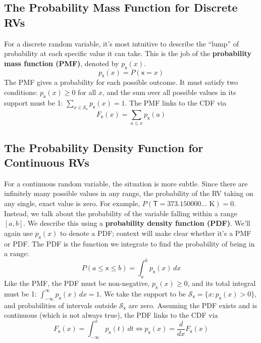 \subsection{The Probability Mass Function for Discrete RVs}
For a discrete random variable, it's most intuitive to describe the ``lump'' of probability at each specific value it can take. This is the job of the \textbf{probability mass function (PMF)}, denoted by $p_{\mathsf{x}}(x)$.
\begin{equation}
    p_{\mathsf{x}}(x) = P(\mathsf{x} = x)
    \label{eq:pmf-def}
\end{equation}
The PMF gives a probability for each possible outcome. It must satisfy two conditions: $p_{\mathsf{x}}(x) \ge 0$ for all $x$, and the sum over all possible values in its support must be 1: $\sum_{x \in \mathcal{S}_{\mathsf{x}}} p_{\mathsf{x}}(x) = 1$. The PMF links to the CDF via
\begin{equation}
    F_{\mathsf{x}}(x) = \sum_{a \le x} p_{\mathsf{x}}(a)
\end{equation}

\subsection{The Probability Density Function for Continuous RVs}
For a continuous random variable, the situation is more subtle. Since there are infinitely many possible values in any range, the probability of the RV taking on any single, exact value is zero. For example, $P(\mathsf{T} = 373.150000... \text{ K}) = 0$. Instead, we talk about the probability of the variable falling within a range $[a,b]$. We describe this using a \textbf{probability density function (PDF)}. We'll again use $p_{\mathsf{x}}(x)$ to denote a PDF; context will make clear whether it's a PMF or PDF. The PDF is the function we integrate to find the probability of being in a range:
\begin{equation}
    P(a \le \mathsf{x} \le b) = \int_{a}^{b} p_{\mathsf{x}}(x)\,dx
    \label{eq:pdf-range}
\end{equation}
Like the PMF, the PDF must be non-negative, $p_{\mathsf{x}}(x) \ge 0$, and its total integral must be 1: $\int_{-\infty}^{\infty} p_{\mathsf{x}}(x)\,dx = 1$. We take the support to be $\mathcal{S}_{\mathsf{x}}=\{x: p_{\mathsf{x}}(x)>0\}$, and probabilities of intervals outside $\mathcal{S}_{\mathsf{x}}$ are zero. Assuming the PDF exists and is continuous (which is not always true), the PDF links to the CDF via
\begin{equation}
    F_{\mathsf{x}}(x) = \int_{-\infty}^{x} p_{\mathsf{x}}(t)\,dt \iff p_{\mathsf{x}}(x) = \frac{d}{dx}F_{\mathsf{x}}(x)
\end{equation}

